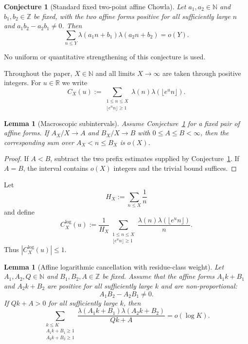 \documentclass[preprint,12pt]{elsarticle}
\numberwithin{equation}{section}
\theoremstyle{plain}
\newtheorem{lemma}[theorem]{Lemma}
\newtheorem{conjecture}[theorem]{Conjecture}
\theoremstyle{definition}
\theoremstyle{remark}
\begin{document}
\begin{conjecture}[Standard fixed two-point affine Chowla]
\label{conj:affine_chowla}
Let $a_1,a_2\in\mathbb N$ and $b_1,b_2\in\mathbb Z$ be fixed, with the two
affine forms positive for all sufficiently large $n$ and
$a_1b_2-a_2b_1\ne0$. Then
\[
\sum_{n\le Y}\lambda(a_1n+b_1)\lambda(a_2n+b_2)=o(Y).
\]
\end{conjecture}

No uniform or quantitative strengthening of this conjecture is used.

Throughout the paper, $X\in\mathbb N$ and all limits $X\to\infty$ are taken
through positive integers. For $u\in\mathbb R$ we write
\begin{equation}
C_X(u):=
\sum_{\substack{1\le n\le X\\ \lfloor e^u n\rfloor\ge1}}
\lambda(n)\lambda(\lfloor e^u n\rfloor).
\label{eq:CXdef}
\end{equation}

\begin{lemma}[Macroscopic subintervals]
\label{lem:macroscopic}
Assume Conjecture~\ref{conj:affine_chowla} for a fixed pair of affine forms.
If $A_X/X\to A$ and $B_X/X\to B$ with $0\le A\le B<\infty$, then the
corresponding sum over $A_X<n\le B_X$ is $o(X)$.
\end{lemma}

\begin{proof}
If $A<B$, subtract the two prefix estimates supplied by
Conjecture~\ref{conj:affine_chowla}. If $A=B$, the interval contains $o(X)$
integers and the trivial bound suffices.
\end{proof}

Let
\[
H_X:=\sum_{n\le X}\frac1n
\]
and define
\begin{equation}
C_X^{\log}(u):=
\frac1{H_X}
\sum_{\substack{1\le n\le X\\ \lfloor e^u n\rfloor\ge1}}
\frac{\lambda(n)\lambda(\lfloor e^u n\rfloor)}n.
\label{eq:logdef}
\end{equation}
Thus $|C_X^{\log}(u)|\le1$.

\begin{lemma}[Affine logarithmic cancellation with residue-class weight]
\label{lem:weighted_tao}
Let $A_1,A_2,Q\in\mathbb N$ and $B_1,B_2,A\in\mathbb Z$ be fixed.
Assume that the affine forms $A_1k+B_1$ and $A_2k+B_2$ are positive for all
sufficiently large $k$ and are non-proportional:
\begin{equation}
A_1B_2-A_2B_1\ne0.
\label{eq:weighted_tao_nonprop}
\end{equation}
If $Qk+A>0$ for all sufficiently large $k$, then
\begin{equation}
\sum_{\substack{k\le K\\A_1k+B_1\ge1\\A_2k+B_2\ge1}}
\frac{\lambda(A_1k+B_1)\lambda(A_2k+B_2)}{Qk+A}
=o(\log K).
\label{eq:weighted_tao}
\end{equation}
\end{lemma}
\end{document}
